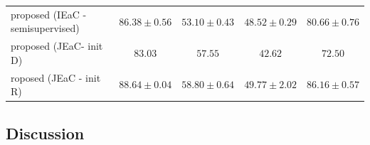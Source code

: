 \documentclass{beamer}
\begin{document}
\begin{frame}
\begin{center}
{\begin{tabular}{|l|c|c|c|c|}
   {\tiny proposed (IEaC - semisupervised)}
                          & \underline{$86.38 \pm 0.56$}              & \underline{$ 53.10\pm 0.43 $}             & $48.52 \pm 0.29$              &$ 80.66 \pm 0.76$ \\
   {\tiny proposed (JEaC- init D)}
                       & $83.03$                        & $57.55$                       & $42.62$          & $72.50$\\
   {\tiny roposed (JEaC - init R)}
                       & \textbf{\em $\mathbf{88.64 \pm 0.04}$}  & \textbf{\em $\mathbf{58.80 \pm 0.64}$} &
                       \underline{$49.77 \pm 2.02$} & \textbf{\em $\mathbf{86.16 \pm 0.57}$} \\
  \hline
  \end{tabular}
  }
\end{center}

\end{frame}

\subsection{Discussion}
\label{sub:Discussion}
\end{document}
